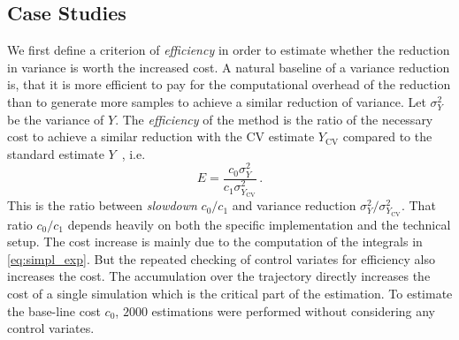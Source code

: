 
\subsection{Case Studies}\label{sec:cv:study}
We first define a criterion of \emph{efficiency} in order to estimate
whether the reduction in variance is worth the increased cost.
A natural baseline of a variance reduction is, that it is more
efficient to pay for
the computational overhead of the reduction than to generate more
samples to achieve a similar
reduction of variance.
Let $\sigma_Y^2$ be the variance of $Y$.
The \emph{efficiency} of the method is the ratio of the necessary
cost to achieve a similar reduction with the \ac{CV} estimate
$Y_{\text{CV}}$ compared to
the standard estimate $Y$~\parencite{l1994efficiency}, i.e.
\begin{equation}\label{eq:efficiency}
  E=\frac{c_0\sigma_Y^2}{c_1\sigma^2_{Y_{\text{CV}}}}\,.
\end{equation}
This is the ratio between \emph{slowdown} $c_0/c_1$ and variance
reduction $\sigma_{Y}^2 / \sigma_{Y_{\text{CV}}}^2$.
That ratio $c_0/c_1$ depends heavily on both the specific
implementation and the technical setup.
The cost increase is  mainly due to the computation of the integrals
in \eqref{eq:simpl_exp}.
But the repeated checking of control  variates for efficiency also
increases the cost.
The accumulation over the trajectory directly increases the cost of a
single simulation
which is the critical part of the estimation.
To estimate the base-line cost $c_0$, $2000$ estimations were performed without
considering any control variates.

